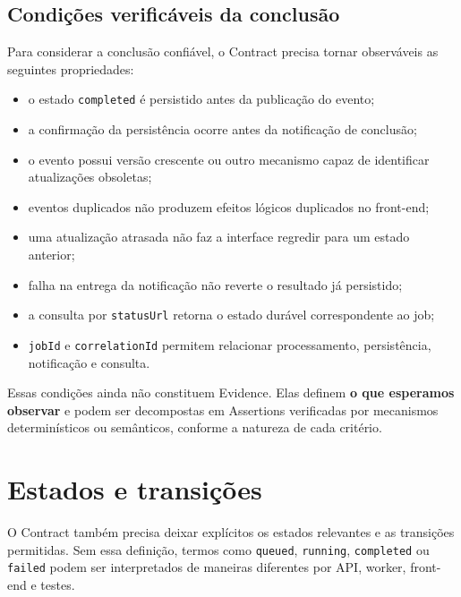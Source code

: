 \documentclass[
  10pt,
  a4paper,
  oneside]{book}
\providecommand{\tightlist}{%
  \setlength{\itemsep}{0pt}\setlength{\parskip}{0pt}}
\begin{document}
\hypertarget{condiuxe7uxf5es-verificuxe1veis-da-conclusuxe3o}{%
\subsection{Condições verificáveis da
conclusão}\label{condiuxe7uxf5es-verificuxe1veis-da-conclusuxe3o}}

Para considerar a conclusão confiável, o Contract precisa tornar
observáveis as seguintes propriedades:

\begin{itemize}
\tightlist
\item
  o estado \texttt{completed} é persistido antes da publicação do
  evento;
\item
  a confirmação da persistência ocorre antes da notificação de
  conclusão;
\item
  o evento possui versão crescente ou outro mecanismo capaz de
  identificar atualizações obsoletas;
\item
  eventos duplicados não produzem efeitos lógicos duplicados no
  front-end;
\item
  uma atualização atrasada não faz a interface regredir para um estado
  anterior;
\item
  falha na entrega da notificação não reverte o resultado já persistido;
\item
  a consulta por \texttt{statusUrl} retorna o estado durável
  correspondente ao job;
\item
  \texttt{jobId} e \texttt{correlationId} permitem relacionar
  processamento, persistência, notificação e consulta.
\end{itemize}

Essas condições ainda não constituem Evidence. Elas definem \textbf{o
que esperamos observar} e podem ser decompostas em Assertions
verificadas por mecanismos determinísticos ou semânticos, conforme a
natureza de cada critério.

\hypertarget{estados-e-transiuxe7uxf5es}{%
\section{Estados e transições}\label{estados-e-transiuxe7uxf5es}}

O Contract também precisa deixar explícitos os estados relevantes e as
transições permitidas. Sem essa definição, termos como \texttt{queued},
\texttt{running}, \texttt{completed} ou \texttt{failed} podem ser
interpretados de maneiras diferentes por API, worker, front-end e
testes.
\end{document}

